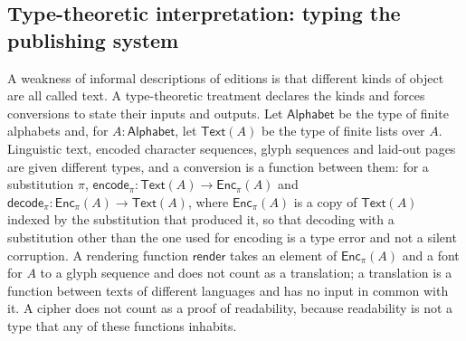 \subsection{Type-theoretic interpretation: typing the publishing system}

A weakness of informal descriptions of editions is that different kinds of object are all called text. A type-theoretic treatment declares the kinds and forces conversions to state their inputs and outputs. Let $\mathsf{Alphabet}$ be the type of finite alphabets and, for $A:\mathsf{Alphabet}$, let $\mathsf{Text}(A)$ be the type of finite lists over $A$. Linguistic text, encoded character sequences, glyph sequences and laid-out pages are given different types, and a conversion is a function between them: for a substitution $\pi$, $\mathsf{encode}_\pi:\mathsf{Text}(A)\to\mathsf{Enc}_\pi(A)$ and $\mathsf{decode}_\pi:\mathsf{Enc}_\pi(A)\to\mathsf{Text}(A)$, where $\mathsf{Enc}_\pi(A)$ is a copy of $\mathsf{Text}(A)$ indexed by the substitution that produced it, so that decoding with a substitution other than the one used for encoding is a type error and not a silent corruption. A rendering function $\mathsf{render}$ takes an element of $\mathsf{Enc}_\pi(A)$ and a font for $A$ to a glyph sequence and does not count as a translation; a translation is a function between texts of different languages and has no input in common with it. A cipher does not count as a proof of readability, because readability is not a type that any of these functions inhabits.

